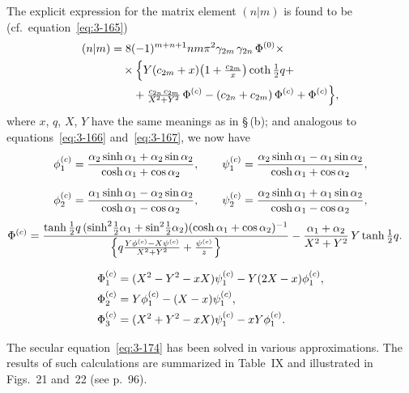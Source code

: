 The explicit expression for the matrix element $(n|m)$ is found to be (cf.\ equation~\eqref{eq:3-165})
\begin{align}
(n|m) &= 8(-1)^{m+n+1}nm\pi^2\gamma_{2m}\,\gamma_{2n}\,\Phi^{(0)}\times \notag\\
&\quad\times\Bigl\{Y(c_{2m}+x)\bigl(1+\tfrac{c_{2m}}{x}\bigr)\coth\tfrac{1}{2}q + \notag\\
&\qquad + \tfrac{c_{2n}\,c_{2m}}{X^2+Y^2}\,\Phi^{(c)} - (c_{2n}+c_{2m})\,\Phi^{(c)} + \Phi^{(c)}\Bigr\}, \label{eq:3-175}
\end{align}
where $x$, $q$, $X$, $Y$ have the same meanings as in \S\,(b); and analogous to equations~\eqref{eq:3-166} and~\eqref{eq:3-167}, we now have
\begin{align}
\phi_1^{(c)} &= \frac{\alpha_2\sinh\alpha_1 + \alpha_2\sin\alpha_2}{\cosh\alpha_1 + \cos\alpha_2}, \qquad
\psi_1^{(c)} = \frac{\alpha_2\sinh\alpha_1 - \alpha_1\sin\alpha_2}{\cosh\alpha_1 + \cos\alpha_2}, \notag\\[6pt]
\phi_2^{(c)} &= \frac{\alpha_1\sinh\alpha_1 - \alpha_2\sin\alpha_2}{\cosh\alpha_1 - \cos\alpha_2}, \qquad
\psi_2^{(c)} = \frac{\alpha_2\sinh\alpha_1 + \alpha_1\sin\alpha_2}{\cosh\alpha_1 - \cos\alpha_2}, \label{eq:3-176}
\end{align}
\begin{align}
\Phi^{(c)} &= \frac{\tanh\tfrac{1}{2}q\,(\sinh^2\!\tfrac{1}{2}\alpha_1 + \sin^2\!\tfrac{1}{2}\alpha_2)(\cosh\alpha_1 + \cos\alpha_2)^{-1}}{\left\{q\frac{Y\phi^{(c)} - X\psi^{(c)}}{X^2+Y^2} + \frac{\psi^{(c)}}{z}\right\}} - \frac{\alpha_1+\alpha_2}{X^2+Y^2}\,Y\tanh\tfrac{1}{2}q. \notag
\end{align}

\begin{align}
\Phi_1^{(c)} &= (X^2 - Y^2 - xX)\psi_1^{(c)} - Y(2X-x)\phi_1^{(c)}, \notag\\
\Phi_2^{(c)} &= Y\phi_1^{(c)} - (X-x)\psi_1^{(c)}, \notag\\
\Phi_3^{(c)} &= (X^2 + Y^2 - xX)\psi_1^{(c)} - xY\phi_1^{(c)}. \label{eq:3-176b}
\end{align}

The secular equation~\eqref{eq:3-174} has been solved in various approximations. The results of such calculations are summarized in Table~IX and illustrated in Figs.~21 and~22 (see p.~96).

